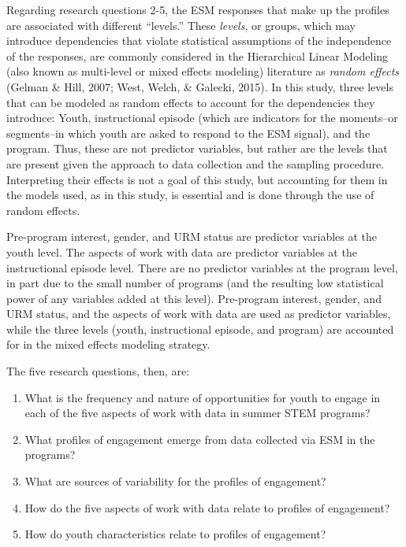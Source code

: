 \documentclass[]{msu-thesis}
\providecommand{\tightlist}{%
  \setlength{\itemsep}{0pt}\setlength{\parskip}{0pt}}
\theoremstyle{definition}
\theoremstyle{definition}
\theoremstyle{definition}
\theoremstyle{remark}
\begin{document}
Regarding research questions 2-5, the ESM responses that make up the
profiles are associated with different ``levels.'' These \emph{levels},
or groups, which may introduce dependencies that violate statistical
assumptions of the independence of the responses, are commonly
considered in the Hierarchical Linear Modeling (also known as
multi-level or mixed effects modeling) literature as \emph{random
effects} (Gelman \& Hill, 2007; West, Welch, \& Galecki, 2015). In this
study, three levels that can be modeled as random effects to account for
the dependencies they introduce: Youth, instructional episode (which are
indicators for the moments--or segments--in which youth are asked to
respond to the ESM signal), and the program. Thus, these are not
predictor variables, but rather are the levels that are present given
the approach to data collection and the sampling procedure. Interpreting
their effects is not a goal of this study, but accounting for them in
the models used, as in this study, is essential and is done through the
use of random effects.

Pre-program interest, gender, and URM status are predictor variables at
the youth level. The aspects of work with data are predictor variables
at the instructional episode level. There are no predictor variables at
the program level, in part due to the small number of programs (and the
resulting low statistical power of any variables added at this level).
Pre-program interest, gender, and URM status, and the aspects of work
with data are used as predictor variables, while the three levels
(youth, instructional episode, and program) are accounted for in the
mixed effects modeling strategy.

The five research questions, then, are:

\begin{enumerate}
\def\labelenumi{\arabic{enumi}.}
\tightlist
\item
  What is the frequency and nature of opportunities for youth to engage
  in each of the five aspects of work with data in summer STEM programs?
\item
  What profiles of engagement emerge from data collected via ESM in the
  programs?
\item
  What are sources of variability for the profiles of engagement?
\item
  How do the five aspects of work with data relate to profiles of
  engagement?
\item
  How do youth characteristics relate to profiles of engagement?
\end{enumerate}
\end{document}
